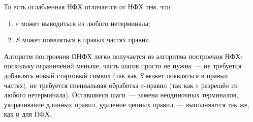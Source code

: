 То есть ослабленная НФХ отличается от НФХ тем, что:
\begin{enumerate}
    \item $\varepsilon$ может выводиться из любого нетерминала;
    \item $S$ может появляться в правых частях правил.
\end{enumerate}

Алгоритм построения ОНФХ легко получается из алгоритма построения НФХ: поскольку ограничений меньше, часть шагов просто не нужна~--- не требуется добавлять новый стартовый символ (так как $S$ может появляться в правых частях), не требуется специальная обработка $\varepsilon$-правил (так как $\varepsilon$ разрешён из любого нетерминала).
Оставшиеся шаги~--- замена неодиночных терминалов, укорачивание длинных правил, удаление цепных правил~--- выполняются так же, как и для НФХ.

